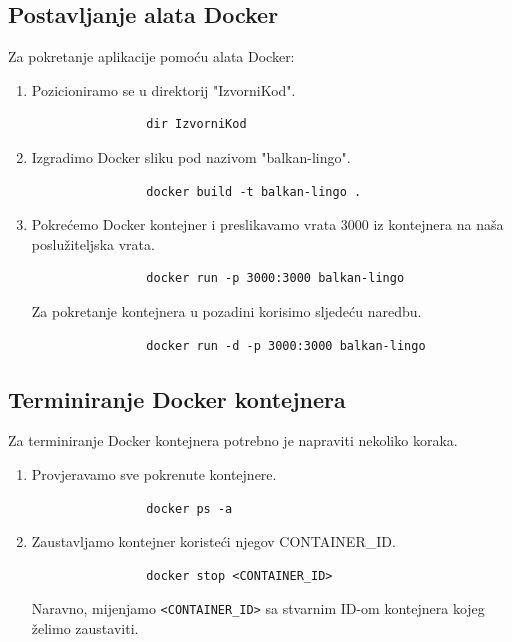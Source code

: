 		\subsection*{Postavljanje alata Docker}
		Za pokretanje aplikacije pomoću alata Docker:
		\begin{enumerate}
			\item Pozicioniramo se u direktorij "IzvorniKod".
			\begin{verbatim}
				dir IzvorniKod
			\end{verbatim}
			\item Izgradimo Docker sliku pod nazivom "balkan-lingo".
			\begin{verbatim}
				docker build -t balkan-lingo .
			\end{verbatim}
			\item Pokrećemo Docker kontejner i preslikavamo vrata 3000 iz kontejnera na naša poslužiteljska vrata.
			\begin{verbatim}
				docker run -p 3000:3000 balkan-lingo
			\end{verbatim}
			Za pokretanje kontejnera u pozadini korisimo sljedeću naredbu.
			\begin{verbatim}
				docker run -d -p 3000:3000 balkan-lingo
			\end{verbatim}
		\end{enumerate}
		
		\subsection*{Terminiranje Docker kontejnera}
		Za terminiranje Docker kontejnera potrebno je napraviti nekoliko koraka.
		\begin{enumerate}
			\item Provjeravamo sve pokrenute kontejnere.
			\begin{verbatim}
				docker ps -a
			\end{verbatim}
			\item Zaustavljamo kontejner koristeći njegov CONTAINER\_ID.
			\begin{verbatim}
				docker stop <CONTAINER_ID>
			\end{verbatim}
			Naravno, mijenjamo \texttt{<CONTAINER\_ID>} sa stvarnim ID-om kontejnera kojeg želimo zaustaviti.
		\end{enumerate}

